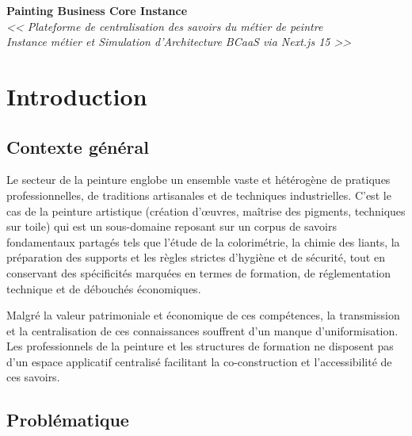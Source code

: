 \documentclass[12pt,a4paper]{report}
\begin{document}
\begin{center}
    {\LARGE\textbf{Painting Business Core Instance}}\\[0.3cm]
    {\Large\textit{<< Plateforme de centralisation des savoirs du métier de peintre\\ Instance métier et Simulation d'Architecture BCaaS via Next.js 15 >>}}\\[1cm]
\end{center}

\tableofcontents
\newpage

\section{Introduction}

\subsection*{Contexte général}

Le secteur de la peinture englobe un ensemble vaste et hétérogène de pratiques professionnelles, de traditions artisanales et de techniques industrielles. C'est le cas de la peinture artistique (création d'œuvres, maîtrise des pigments, techniques sur toile) qui est un sous-domaine reposant sur un corpus de savoirs fondamentaux partagés tels que l'étude de la colorimétrie, la chimie des liants, la préparation des supports et les règles strictes d'hygiène et de sécurité, tout en conservant des spécificités marquées en termes de formation, de réglementation technique et de débouchés économiques.

Malgré la valeur patrimoniale et économique de ces compétences, la transmission et la centralisation de ces connaissances souffrent d'un manque d'uniformisation. Les professionnels de la peinture et les structures de formation ne disposent pas d'un espace applicatif centralisé facilitant la co-construction et l'accessibilité de ces savoirs.

\subsection*{Problématique}
\end{document}

